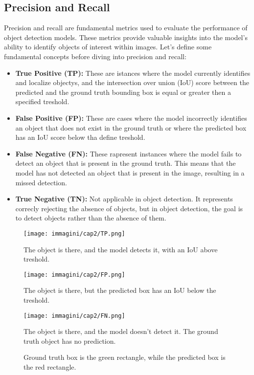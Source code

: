 \subsection*{Precision and Recall}
Precision and recall are fundamental metrics used to evaluate the performance of object detection models. These metrics provide valuable insights into the model's ability to identify objects of interest within images. 
Let's define some fundamental concepts before diving into precision and recall:
\begin{itemize}
    \item \textbf{True Positive (TP):} These are istances where the model currently identifies and localize objectys, and the intersection over union (IoU) score between the predicted and the ground truth bounding box is equal or greater then a specified treshold.
    \item \textbf{False Positive (FP):} These are cases where the model incorrectly identifies an object that does not exist in the ground truth or where the predicted box has an IoU score below tha define treshold.
    \item \textbf{False Negative (FN):} These rapresent instances where the model fails to detect an object that is present in the ground truth. This means that the model has not detected an object that is present in the image, resulting in a missed detection.
    \item \textbf{True Negative (TN):} Not applicable in object detection. It represents correcly rejecting the absence of objects, but in object detection, the goal is to detect objects rather than the absence of them.
\end{itemize}

\begin{figure}[!ht]
\centering
\begin{minipage}[t]{0.3\textwidth}
    \centering
    \texttt{[image: immagini/cap2/TP.png]}
    \caption{The object is there, and the model detects it, with an IoU above treshold.}
    \label{fig:TP}
\end{minipage}
\hfill
\begin{minipage}[t]{0.3\textwidth}
    \centering
    \texttt{[image: immagini/cap2/FP.png]}
    \caption{The object is there, but the predicted box has an IoU below the treshold.}
    \label{fig:FP}
\end{minipage}
\hfill
\begin{minipage}[t]{0.3\textwidth}
    \centering
    \texttt{[image: immagini/cap2/FN.png]}
    \caption{The object is there, and the model doesn't detect it. The ground truth object has no prediction.}
    \label{fig:FN}
\end{minipage}
\caption{Ground truth box is the green rectangle, while the predicted box is the red rectangle.}
\label{fig:TP_FP_FN}
\end{figure}

